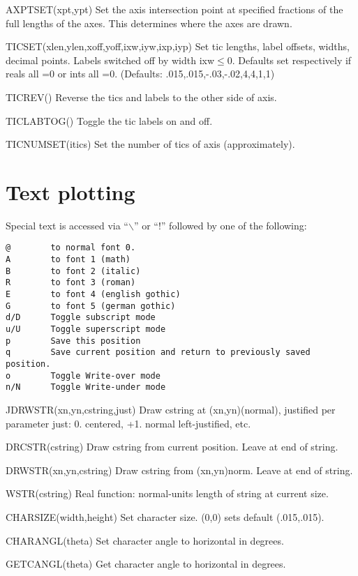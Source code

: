 \documentclass[12pt]{article}
\newif \iftth
\begin{document}
AXPTSET(xpt,ypt) Set the axis intersection point at specified fractions of
the full lengths of the axes. This determines where the axes are drawn.

TICSET(xlen,ylen,xoff,yoff,ixw,iyw,ixp,iyp) Set tic lengths, label
offsets, widths, decimal points. Labels switched off by width
ixw$\le$0. Defaults set respectively if reals all =0 or ints all
=0. (Defaults: .015,.015,-.03,-.02,4,4,1,1)

TICREV() Reverse the tics and labels to the other side of axis.

TICLABTOG() Toggle the tic labels on and off.

TICNUMSET(itics) Set the number of tics of axis (approximately).

\section{Text plotting}

\iftth \special{html:<img align="right" src="fontshow.png">} \fi

Special text is accessed via ``$\backslash$'' or ``!'' followed by one of 
the following:
\begin{verbatim}
@        to normal font 0.
A        to font 1 (math)
B        to font 2 (italic)
R        to font 3 (roman)
E        to font 4 (english gothic)
G        to font 5 (german gothic)
d/D      Toggle subscript mode
u/U      Toggle superscript mode
p        Save this position
q        Save current position and return to previously saved position.
o        Toggle Write-over mode
n/N      Toggle Write-under mode
\end{verbatim}


JDRWSTR(xn,yn,cstring,just) Draw cstring at (xn,yn)(normal), justified
per parameter just:  0. centered, +1. normal left-justified, etc.

DRCSTR(cstring) Draw cstring from current position. Leave at end of string.

DRWSTR(xn,yn,cstring) Draw cstring from (xn,yn)norm. Leave at end of
string.

WSTR(cstring) Real function: normal-units length of string at current size.

CHARSIZE(width,height) Set character size. (0,0) sets default (.015,.015).

CHARANGL(theta) Set character angle to horizontal in degrees.

GETCANGL(theta) Get character angle to horizontal in degrees.
\end{document}
